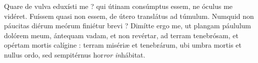 \lettrine{Q}{}uare de vulva eduxísti me ? qui útinam consúmptus essem, ne óculus me vidéret.
Fuíssem quasi non essem, de útero translátus ad túmulum.
Numquid non páucitas diérum meórum finiétur brevi ? Dimítte ergo me, ut plangam páululum dolórem meum,
ántequam vadam, et non revértar, ad terram tenebrósam, et opértam mortis calígine :
terram misériæ et tenebrárum, ubi umbra mortis et nullus ordo, sed sempitérnus hor\textit{ror in}hábitat.